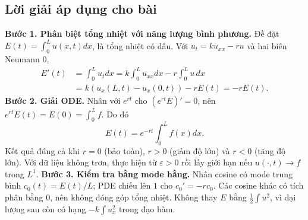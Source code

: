 \documentclass[10pt,a4paper]{article}
\begin{document}
\subsection*{Lời giải áp dụng cho bài}
\textbf{Bước 1. Phân biệt tổng nhiệt với năng lượng bình phương.}
Đề đặt $E(t)=\int_0^Lu(x,t)dx$, là tổng nhiệt có dấu. Với $u_t=ku_{xx}-ru$ và hai biên Neumann $0$,
\begin{align*}
E'(t)&=\int_0^Lu_tdx=k\int_0^Lu_{xx}dx-r\int_0^Lu\,dx\\
&=k(u_x(L,t)-u_x(0,t))-rE(t)=-rE(t).
\end{align*}
\textbf{Bước 2. Giải ODE.}
Nhân với $e^{rt}$ cho $(e^{rt}E)'=0$, nên $e^{rt}E(t)=E(0)=\int_0^Lf$. Do đó
\[E(t)=e^{-rt}\int_0^Lf(x)dx.\]
Kết quả đúng cả khi $r=0$ (bảo toàn), $r>0$ (giảm độ lớn) và $r<0$ (tăng độ lớn). Với dữ liệu không trơn, thực hiện từ $\varepsilon>0$ rồi lấy giới hạn nếu $u(\cdot,t)\to f$ trong $L^1$.
\textbf{Bước 3. Kiểm tra bằng mode hằng.}
Nhân cosine có mode trung bình $c_0(t)=E(t)/L$; PDE chiếu lên $1$ cho $c_0'=-rc_0$. Các cosine khác có tích phân bằng $0$, nên không đóng góp tổng nhiệt. Không thay $E$ bằng $\frac12\int u^2$, vì đại lượng sau còn có hạng $-k\int u_x^2$ trong đạo hàm.
\end{document}

